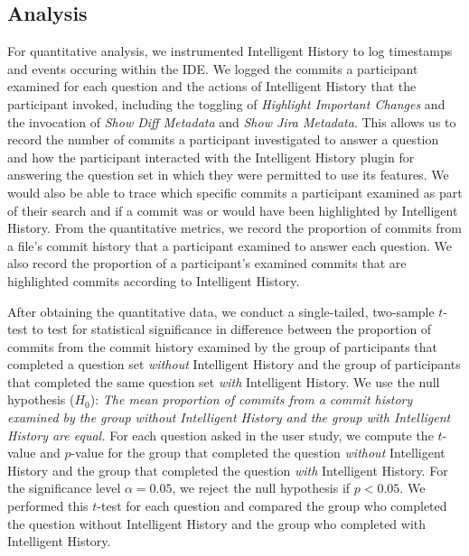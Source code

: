 \subsection{Analysis}
\label{subsec:Analysis}

For quantitative analysis, we instrumented Intelligent History to log timestamps and events occuring within the IDE.
We logged the commits a participant examined for each question and the actions of Intelligent History that the participant invoked,
including the toggling of \textit{Highlight Important Changes} and the invocation of \textit{Show Diff Metadata} and \textit{Show Jira Metadata}.
This allows us to record the number of commits a participant investigated to answer a question and how the participant interacted with the Intelligent History plugin for answering the question set in which they were permitted to use its features.
We would also be able to trace which specific commits a participant examined as part of their search and if a commit was or would have been highlighted by Intelligent History.
From the quantitative metrics, we record the proportion of commits from a file's commit history that a participant examined to answer each question.
We also record the proportion of a participant's examined commits that are highlighted commits according to Intelligent History.

After obtaining the quantitative data, we conduct a single-tailed, two-sample $t$-test to test for statistical significance in difference between the proportion of commits from the commit history examined by the group of participants that completed a question set \emph{without} Intelligent History and the group of participants that completed the same question set \emph{with} Intelligent History.
We use the null hypothesis ($H_{0}$): 
\textit{The mean proportion of commits from a commit history examined by the group without Intelligent History and the group with Intelligent History are equal.}
For each question asked in the user study, we compute the $t$-value and $p$-value for the group that completed the question \emph{without} Intelligent History and the group that completed the question \emph{with} Intelligent History.
For the significance level $\alpha = 0.05$, we reject the null hypothesis if $p < 0.05$.
We performed this $t$-test for each question and compared the group who completed the question without Intelligent History and the group who completed with Intelligent History.


